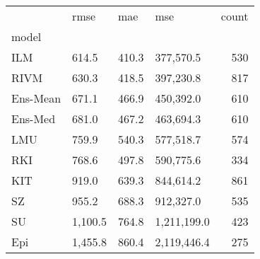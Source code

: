 \begin{tabular}{llllr}
\toprule
 & rmse & mae & mse & count \\
model &  &  &  &  \\
\midrule
ILM & 614.5 & 410.3 & 377,570.5 & 530 \\
RIVM & 630.3 & 418.5 & 397,230.8 & 817 \\
Ens-Mean & 671.1 & 466.9 & 450,392.0 & 610 \\
Ens-Med & 681.0 & 467.2 & 463,694.3 & 610 \\
LMU & 759.9 & 540.3 & 577,518.7 & 574 \\
RKI & 768.6 & 497.8 & 590,775.6 & 334 \\
KIT & 919.0 & 639.3 & 844,614.2 & 861 \\
SZ & 955.2 & 688.3 & 912,327.0 & 535 \\
SU & 1,100.5 & 764.8 & 1,211,199.0 & 423 \\
Epi & 1,455.8 & 860.4 & 2,119,446.4 & 275 \\
\bottomrule
\end{tabular}
